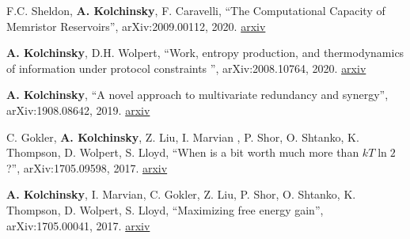 
F.C. Sheldon, \textbf{A. Kolchinsky}, F. Caravelli, ``The Computational Capacity of Memristor Reservoirs'', arXiv:2009.00112, 2020. \href{http://arxiv.org/abs/2009.00112}{arxiv}


\textbf{A. Kolchinsky}, D.H. Wolpert, ``Work, entropy production, and thermodynamics of information under protocol constraints
'', arXiv:2008.10764, 2020. \href{http://arxiv.org/abs/2008.10764}{arxiv}


\textbf{A. Kolchinsky}, ``A novel approach to multivariate redundancy and synergy'', arXiv:1908.08642, 2019. \href{https://arxiv.org/abs/1908.08642}{arxiv}

C. Gokler, \textbf{A. Kolchinsky}, Z. Liu, I. Marvian , P. Shor, O. Shtanko, K. Thompson, D. Wolpert, S. Lloyd, ``When is a bit worth much more than $kT \ln 2$?'', arXiv:1705.09598, 2017. \href{https://arxiv.org/abs/1705.09598}{arxiv}

\textbf{A. Kolchinsky}, I. Marvian, C. Gokler, Z. Liu, P. Shor, O. Shtanko, K. Thompson, D. Wolpert, S. Lloyd, ``Maximizing free energy gain'', arXiv:1705.00041, 2017. \href{https://arxiv.org/abs/1705.00041}{arxiv}


